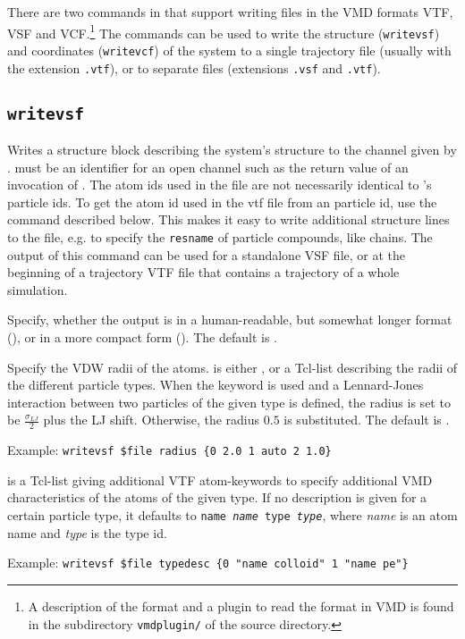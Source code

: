 There are two commands in \es{} that support writing files in the VMD
formats VTF, VSF and VCF.\footnote{A description of the format and a
  plugin to read the format in VMD is found in the subdirectory
  \texttt{vmdplugin/} of the \es{} source directory.} The commands can
be used to write the structure (\texttt{writevsf}) and coordinates
(\texttt{writevcf}) of the system to a single trajectory file (usually
with the extension \texttt{.vtf}), or to separate files (extensions
\texttt{.vsf} and \texttt{.vtf}).

\subsection{\texttt{writevsf}}

{   
  }

Writes a structure block describing the system's structure to the
channel given by .  must be an
identifier for an open channel such as the return value of an
invocation of . The atom ids used in the file are not
necessarily identical to \es's particle ids. To get the atom id used
in the vtf file from an \es particle id, use the command
 described below. This makes it easy to write
additional structure lines to the file, e.g. to specify the
\texttt{resname} of particle compounds, like chains.  The output of
this command can be used for a standalone VSF file, or at the
beginning of a trajectory VTF file that contains a trajectory of a
whole simulation.

\begin{arguments}
\item[\opt{<short|verbose>}]
  Specify, whether the output is in a human-readable, but somewhat
  longer format (), or in a more compact form
  (). The default is .
  
\item[\opt{radius <\var{radii}|auto>}]
  Specify the VDW radii of the atoms.  is either
  , or a Tcl-list describing the radii of the different
  particle types. When the keyword  is used and a
  Lennard-Jones interaction between two particles of the given type is
  defined, the radius is set to be $\frac{\sigma_{LJ}}{2}$ plus the LJ
  shift.  Otherwise, the radius $0.5$ is substituted. The default is
  .
  
  Example: \verb!writevsf $file radius {0 2.0 1 auto 2 1.0}!
  
\item[\opt{typedesc \var{typedesc}}]
   is a Tcl-list giving additional VTF atom-keywords to
  specify additional VMD characteristics of the atoms of the given type.
  If no description is given for a certain particle type, it defaults to
  \texttt{name \textit{name} type \textit{type}}, where \textit{name}
  is an atom name and \textit{type} is the type id.
  
  Example: \verb!writevsf $file typedesc {0 "name colloid" 1 "name pe"}!
\end{arguments}

